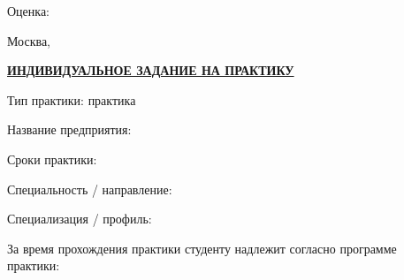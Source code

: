 \vfill

\titlestudenttable

\vfill

\begin{justify}
    \noindent\fontsize{12}{12}\selectfont
    Оценка: \placeholder
\end{justify}

\vfill

\begin{center}
    \fontsize{12}{12}\selectfont

    Москва, \year
\end{center}

\thispagestyle{empty}


\newpage
\clearpage
\fancytwo
\thispagestyle{fancy}
\titletitle

\begin{center}
    \fontsize{18}{18}\selectfont
    \textbf{\underline{ИНДИВИДУАЛЬНОЕ ЗАДАНИЕ НА ПРАКТИКУ}}
\end{center}

\begin{justify}
    \fontsize{12}{12}\selectfont
    \noindent
    Тип практики: \practicetype{} практика

    \noindent
    Название предприятия: \practicefacility

    \noindent
    Сроки практики: \practiceduration

    \noindent
    Специальность / направление: \practicespec

    \noindent
    Специализация / профиль: \practiceprofile

\end{justify}

\begin{justify}
    \fontsize{12}{12}\selectfont
    За время прохождения практики студенту надлежит согласно программе практики:

    \practicetasks
\end{justify}

\minussingle
\titlestudenttable

\newpage
